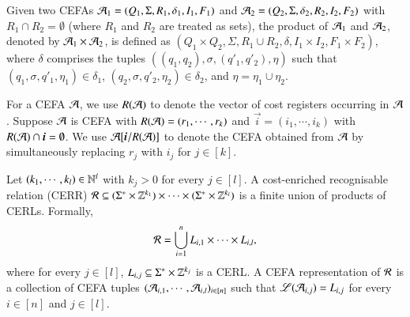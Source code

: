 Given two CEFAs $\mathcal{A}_1 = ( Q_1, \Sigma, R_1, \delta_1, I_1, F_1)$ and $\mathcal{A}_2 = (Q_2, \Sigma, \delta_2, R_2, I_2, F_2)$ with $R_1 \cap R_2 = \emptyset$ (where %
$R_1$ and $R_2$ are treated as sets), the product of $\mathcal{A}_1$ and $\mathcal{A}_2$, denoted by $\mathcal{A}_1 \times \mathcal{A}_2$, is defined as $(Q_1 \times Q_2, \Sigma, R_1 \cup R_2, \delta, I_1 \times I_2, F_1 \times F_2)$, where $\delta$ comprises the tuples $((q_1, q_2), \sigma, (q'_1, q'_2), \eta)$ such that $(q_1, \sigma, q'_1, \eta_1) \in \delta_1$, $(q_2, \sigma, q'_2, \eta_2) \in \delta_2$, and $\eta = \eta_1\cup \eta_2$.  %


For a CEFA $\mathcal{A}$, we use $R(\mathcal{A})$ to denote the vector of cost registers occurring in $\mathcal{A}$. %
Suppose $\mathcal{A}$ is  CEFA with $R(\mathcal{A})=(r_1,\cdots, r_k)$ and $\vec{i} = (i_1,\cdots, i_k)$ with $R(\NFA) \cap \vec{i} = \emptyset$. We use $\CEFA[\vec{i}/R(\CEFA)]$ to denote the CEFA obtained from $\mathcal{A}$ by simultaneously replacing $r_j$ with $i_j$ for $j \in [k]$. 

\smallskip


\begin{definition}
Let $(k_1,\cdots, k_l) \in \mathbb{N}^l$ with $k_j > 0$ for every $j \in [l]$. A cost-enriched recognisable relation (CERR)  $\mathcal{R} \subseteq (\Sigma^* \times \mathbb{Z}^{k_1}) \times \cdots  \times (\Sigma^* \times \mathbb{Z}^{k_l})$ is a finite union of products of CERLs. Formally,
	\[\mathcal{R} = \bigcup \limits_{i=1}^n L_{i,1 } \times \cdots \times L_{i, l},\]
	where for every $j \in [l]$, $L_{i,j} \subseteq \Sigma^* \times \mathbb{Z}^{k_j}$ is a CERL. 
	A CEFA representation of $\mathcal{R}$ is a collection of CEFA tuples $(\mathcal{A}_{i,1}, \cdots, \mathcal{A}_{i,l})_{i \in [n]}$ such that $\mathscr{L}(\mathcal{A}_{i,j}) = L_{i,j}$ for every $i \in [n]$ and $j \in [l]$.
\end{definition}

